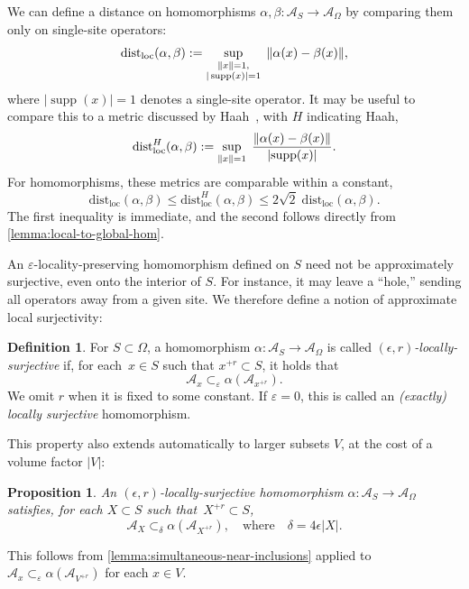 \documentclass[11pt,reqno]{amsart}
\newtheorem{proposition}[theorem]{Proposition}
\theoremstyle{definition}
\newtheorem{definition}[theorem]{Definition}
\theoremstyle{remark}
\numberwithin{equation}{section}
\DeclareMathOperator{\supp}{supp}
\newcommand{\eps}{\varepsilon}
\newcommand{\cA}{\mathcal A}
\DeclarePairedDelimiter\norm{\lVert}{\rVert}
\newcommand{\distloc}{\mathrm{dist}_\mathrm{loc}}
\newcommand{\distlocH}{\mathrm{dist}_\mathrm{loc}^H}
\begin{document}
We can define a distance on homomorphisms $\alpha,\beta : \cA_S \to \cA_\Omega$ by comparing them only on single-site operators:
\begin{equation}\label{eq:dist-local}
\distloc(\alpha,\beta)
:= \sup_{\substack{\norm{x}=1,\\ |\supp(x)|=1}}\;\|\alpha(x)-\beta(x)\|,
\end{equation}
where $|\supp(x)|=1$ denotes a single-site operator.
It may be useful to compare this to a metric discussed by Haah~\cite[App.~A]{haah2023invertible}, with $H$ indicating Haah,
\begin{equation*}
\distlocH(\alpha,\beta)
:= \sup_{\norm{x}=1}\;
\frac{\|\alpha(x)-\beta(x)\|}{|\mathrm{supp}(x)|}.
\end{equation*}
For homomorphisms, these metrics are comparable within a constant,
\begin{equation*}
\distloc(\alpha,\beta) \le \distlocH(\alpha,\beta)\le 2\sqrt{2}\;\distloc(\alpha,\beta).
\end{equation*}
The first inequality is immediate, and the second follows directly from \cref{lemma:local-to-global-hom}.

An $\eps$-locality-preserving homomorphism defined on $S$ need not be approximately surjective, even onto the interior of $S$.
For instance, it may leave a ``hole,'' sending all operators away from a given site.
We therefore define a notion of approximate local surjectivity:

\begin{definition}
    For $S \subset \Omega$, a homomorphism $\alpha : \cA_S \to \cA_\Omega$ is called \emph{$(\epsilon,r)$-locally-surjective} if, for each~$x \in S$ such that $x^{+r} \subset S$, it holds that
    \begin{equation*}
    \cA_x \subset_\eps \alpha(\cA_{x^{+r}}).
    \end{equation*}
    We omit $r$ when it is fixed to some constant.
    If $\eps=0$, this is called an \emph{(exactly) locally surjective} homomorphism.
\end{definition}
\noindent
This property also extends automatically to larger subsets $V$, at the cost of a volume factor $|V|$:
\begin{proposition} \label{prop:extend-loc-surjectivity}
An $(\epsilon,r)$-locally-surjective homomorphism $\alpha : \cA_S \to \cA_\Omega$ satisfies, for each $X \subset S$ such that~$X^{+r} \subset S$,
\begin{equation*}
    \cA_X \subset_\delta \alpha(\cA_{X^{+r}}), \quad \text{where} \quad \delta = 4 \epsilon |X|.
\end{equation*}
\end{proposition}
\noindent This follows from \cref{lemma:simultaneous-near-inclusions} applied to $\cA_x \subset_\eps \alpha(\cA_{V^{+r}})$ for each $x \in V$.
\end{document}
